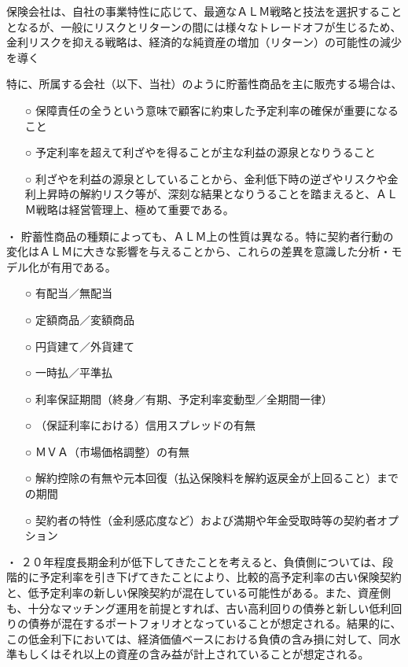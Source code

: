 \documentclass[report,gutter=10mm,fore-edge=10mm,uplatex,dvipdfmx]{jlreq}
\begin{document}
保険会社は、自社の事業特性に応じて、最適なＡＬＭ戦略と技法を選択することとなるが、一般にリスクとリターンの間には様々なトレードオフが生じるため、金利リスクを抑える戦略は、経済的な純資産の増加（リターン）の可能性の減少を導く

特に、所属する会社（以下、当社）のように貯蓄性商品を主に販売する場合は、

\begin{itemize}
 \item [○]  保障責任の全うという意味で顧客に約束した予定利率の確保が重要になること
 \item [○]  予定利率を超えて利ざやを得ることが主な利益の源泉となりうること
 \item [○]  利ざやを利益の源泉としていることから、金利低下時の逆ざやリスクや金利上昇時の解約リスク等が、深刻な結果となりうることを踏まえると、ＡＬＭ戦略は経営管理上、極めて重要である。
\end{itemize}

・ 貯蓄性商品の種類によっても、ＡＬＭ上の性質は異なる。特に契約者行動の変化はＡＬＭに大きな影響を与えることから、これらの差異を意識した分析・モデル化が有用である。

\begin{itemize}
 \item [○]  有配当／無配当
 \item [○]  定額商品／変額商品
 \item [○]  円貨建て／外貨建て
 \item [○]  一時払／平準払
 \item [○]  利率保証期間（終身／有期、予定利率変動型／全期間一律）
 \item [○]  （保証利率における）信用スプレッドの有無
 \item [○]  ＭＶＡ（市場価格調整）の有無
 \item [○]  解約控除の有無や元本回復（払込保険料を解約返戻金が上回ること）までの期間
 \item [○]  契約者の特性（金利感応度など）および満期や年金受取時等の契約者オプション
\end{itemize}

・ ２０年程度長期金利が低下してきたことを考えると、負債側については、段階的に予定利率を引き下げてきたことにより、比較的高予定利率の古い保険契約と、低予定利率の新しい保険契約が混在している可能性がある。また、資産側も、十分なマッチング運用を前提とすれば、古い高利回りの債券と新しい低利回りの債券が混在するポートフォリオとなっていることが想定される。結果的に、この低金利下においては、経済価値ベースにおける負債の含み損に対して、同水準もしくはそれ以上の資産の含み益が計上されていることが想定される。
\end{document}
